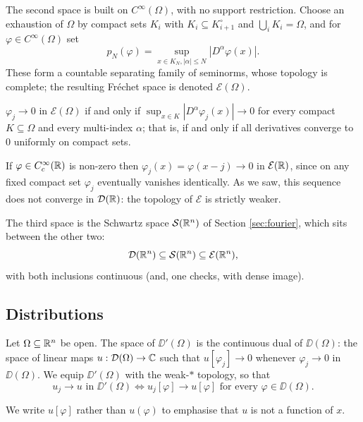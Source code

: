 \documentclass[a4paper]{scrartcl}
\newcommand{\Sch}{\mathcal{S}}
\newcommand{\Ecal}{\mathcal{E}}
\begin{document}
The second space is built on $C^\infty(\Omega)$, with no support restriction. Choose an exhaustion of $\Omega$ by compact sets $K_i$ with $K_i \subseteq K_{i+1}^\circ$ and $\bigcup_i K_i = \Omega$, and for $\varphi \in C^\infty(\Omega)$ set
$$p_N(\varphi) = \sup_{x \in K_N, |\alpha|\le N}|D^\alpha \varphi(x)|.$$
These form a countable separating family of seminorms, whose topology is complete; the resulting Fr\'echet space is denoted $\Ecal(\Omega)$.

\begin{theorem}\label{thm:Etopology}
	$\varphi_j \to 0$ in $\Ecal(\Omega)$ if and only if $\sup_{x \in K}|D^\alpha \varphi_j(x)|\to 0$ for every compact $K\subseteq\Omega$ and every multi-index $\alpha$; that is, if and only if all derivatives converge to $0$ uniformly on compact sets.
\end{theorem}

\begin{example}
	If $\varphi\in C_c^\infty(\mathbb{R})$ is non-zero then $\varphi_j(x)=\varphi(x-j)\to 0$ in $\Ecal(\R)$, since on any fixed compact set $\varphi_j$ eventually vanishes identically. As we saw, this sequence does not converge in $\mathcal{D}(\mathbb{R})$: the topology of $\Ecal$ is strictly weaker.
\end{example}

The third space is the Schwartz space $\Sch(\R^n)$ of Section \ref{sec:fourier}, which sits between the other two:
$$\DD(\R^n)\subseteq\Sch(\R^n)\subseteq\Ecal(\R^n),$$
with both inclusions continuous (and, one checks, with dense image).

\subsection{Distributions}

\begin{definition}[Distribution]
	Let $\Omega\subseteq\mathbb{R}^n$ be open. The space of  $\DD'(\Omega)$ is the continuous dual of $\DD(\Omega)$: the space of linear maps $u : \mathcal{D}(\Omega)\to\mathbb{C}$ such that $u[\varphi_j]\to 0$ whenever $\varphi_j \to 0$ in $\DD(\Omega)$. We equip $\DD'(\Omega)$ with the weak-$*$ topology, so that
	$$u_j \to u \text{ in } \DD'(\Omega) \iff u_j[\varphi]\to u[\varphi] \text{ for every } \varphi \in \DD(\Omega).$$
\end{definition}

We write $u[\varphi]$ rather than $u(\varphi)$ to emphasise that $u$ is not a function of $x$.
\end{document}
